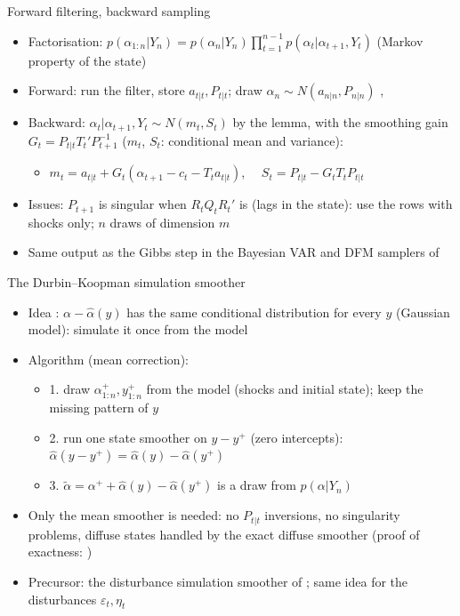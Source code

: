 \begin{frame}{Forward filtering, backward sampling}
\itemsize{\small}
\begin{itemize}
    \item Factorisation: $p(\alpha_{1:n} | Y_n) = p(\alpha_n | Y_n)\prod_{t=1}^{n-1}p(\alpha_t | \alpha_{t+1}, Y_t)$ (Markov property of the state)
    \item Forward: run the filter, store $a_{t|t}, P_{t|t}$; draw $\alpha_n \sim N(a_{n|n}, P_{n|n})$ , 
    \item Backward: $\alpha_t | \alpha_{t+1}, Y_t \sim N(m_t, S_t)$ by the lemma, with the smoothing gain $G_t = P_{t|t}T_t'P_{t+1}^{-1}$ ($m_t$, $S_t$: conditional mean and variance):
    \begin{itemize}
        \item $m_t = a_{t|t} + G_t(\alpha_{t+1} - c_t - T_ta_{t|t})$, $\quad S_t = P_{t|t} - G_tT_tP_{t|t}$
    \end{itemize}
    \item Issues: $P_{t+1}$ is singular when $R_tQ_tR_t'$ is (lags in the state): use the rows with shocks only; $n$ draws of dimension $m$
    \item Same output as the Gibbs step in the Bayesian VAR and DFM samplers of 
\end{itemize}
\end{frame}

\begin{frame}{The Durbin--Koopman simulation smoother}
\itemsize{\small}
\begin{itemize}
    \item Idea : $\alpha - \hat\alpha(y)$ has the same conditional distribution for every $y$ (Gaussian model): simulate it once from the model
    \item Algorithm (mean correction):
    \begin{itemize}
        \item 1. draw $\alpha^+_{1:n}, y^+_{1:n}$ from the model (shocks and initial state); keep the missing pattern of $y$
        \item 2. run one state smoother on $y - y^+$ (zero intercepts): $\hat\alpha(y - y^+) = \hat\alpha(y) - \hat\alpha(y^+)$
        \item 3. $\tilde\alpha = \alpha^+ + \hat\alpha(y) - \hat\alpha(y^+)$ is a draw from $p(\alpha | Y_n)$
    \end{itemize}
    \item Only the mean smoother is needed: no $P_{t|t}$ inversions, no singularity problems, diffuse states handled by the exact diffuse smoother (proof of exactness: )  %
    \item Precursor: the disturbance simulation smoother of ; same idea for the disturbances $\varepsilon_t, \eta_t$
\end{itemize}
\end{frame}

